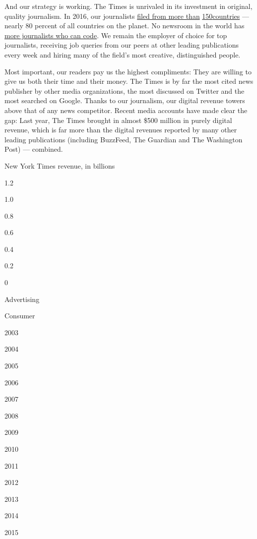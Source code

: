 And our strategy is working. The Times is unrivaled in its investment in
original, quality journalism. In 2016, our journalists
\href{https://www.nytimes3xbfgragh.onion/2016/12/17/world/we-were-there.html}{filed
from more than}
\href{https://www.nytimes3xbfgragh.onion/2016/12/17/world/we-were-there.html}{150}\href{https://www.nytimes3xbfgragh.onion/2016/12/17/world/we-were-there.html}{countries}
--- nearly 80 percent of all countries on the planet. No newsroom in the
world has
\href{https://www.nytimes3xbfgragh.onion/interactive/2016/12/28/us/year-in-interactive-graphics.html}{more
journalists who can code}. We remain the employer of choice for top
journalists, receiving job queries from our peers at other leading
publications every week and hiring many of the field's most creative,
distinguished people.

Most important, our readers pay us the highest compliments: They are
willing to give us both their time and their money. The Times is by far
the most cited news publisher by other media organizations, the most
discussed on Twitter and the most searched on Google. Thanks to our
journalism, our digital revenue towers above that of any news
competitor. Recent media accounts have made clear the gap: Last year,
The Times brought in almost \$500 million in purely digital revenue,
which is far more than the digital revenues reported by many other
leading publications (including BuzzFeed, The Guardian and The
Washington Post) --- combined.

New York Times revenue, in billions

1.2

1.0

0.8

0.6

0.4

0.2

0

Advertising

Consumer

2003

2004

2005

2006

2007

2008

2009

2010

2011

2012

2013

2014

2015

